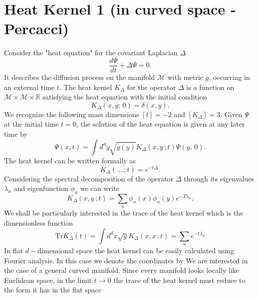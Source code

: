 

\chapter{Heat Kernel 1 (in curved space - Percacci)}
Consider the "heat equation" for the covariant Laplacian $\Delta$
\begin{equation}
    \frac{d\Psi}{dt}+ \Delta \Psi = 0.
\end{equation}
It describes the diffusion process on the manifold $\mathcal{M}$ with metric $g$, occurring in an external time $t$. The heat kernel $K_{\Delta}$ for the operator $\Delta$ is a function on $\mathcal{M} \times \mathcal{M} \times \mathbb{R}$ satisfying the heat equation with the initial condition
\begin{equation}
    K_{\Delta}(x,y;\, 0) = \delta(x,y).
\end{equation}
We recognize the following mass dimensions $[t]=-2$ and $[K_{\Delta}] = 3$. Given $\Psi$ at the initial time $t=0$, the solution of the heat equation is given at any later time by
\begin{equation}
    \Psi(x,t) = \int d^d y \sqrt{g(y)}K_{\Delta}(x,y\,;t) \Psi(y,\,0).
\end{equation}
The heat kernel can be written formally as 
\begin{equation}
    K_{\Delta}(.,.;t) = e^{-t\Delta}.
\end{equation}
Considering the spectral decomposition of the operator $\Delta$ through its eigenvalues $\lambda_n$ and eigenfunction $\phi_n$ we can write
\begin{equation}
    K_{\Delta}(x,y\,;t) = \sum_n \phi_n(x) \phi_n(y) e^{-T\lambda_n}.
\end{equation}
We shall be particularly interested in the trace of the heat kernel which is the dimensionless function
\begin{equation}
    \text{Tr}K_{\Delta}(t) = \int d^d x \sqrt{g} K_{\Delta}(x,x\,;t) = \sum_n e^{-t\lambda_n}
\end{equation}
In flat $d-$dimensional space the heat kernel can be easily calculated using Fourier analysis. In this case we denote the coordinates by 
We are interested in the case of a general curved manifold. Since every manifold looks locally like Euclidean space, in the limit $t \xrightarrow{} 0$ the trace of the heat kernel must reduce to the form it has in the flat space




